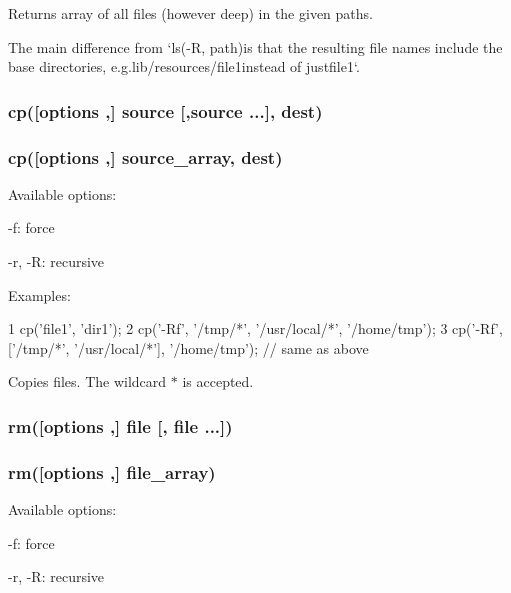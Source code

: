 Returns array of all files (however deep) in the given paths.

The main difference from `ls(\textquotesingle{}-\/\+R\textquotesingle{}, path){\ttfamily is that the resulting file names include the base directories, e.\+g.}lib/resources/file1{\ttfamily instead of just}file1`.

\subsubsection*{cp(\mbox{[}options ,\mbox{]} source \mbox{[},source ...\mbox{]}, dest)}

\subsubsection*{cp(\mbox{[}options ,\mbox{]} source\+\_\+array, dest)}

Available options\+:


\begin{DoxyItemize}
\item {\ttfamily -\/f}\+: force
\item {\ttfamily -\/r, -\/\+R}\+: recursive
\end{DoxyItemize}

Examples\+:


\begin{DoxyCode}
1 cp('file1', 'dir1');
2 cp('-Rf', '/tmp/*', '/usr/local/*', '/home/tmp');
3 cp('-Rf', ['/tmp/*', '/usr/local/*'], '/home/tmp'); // same as above
\end{DoxyCode}


Copies files. The wildcard {\ttfamily $\ast$} is accepted.

\subsubsection*{rm(\mbox{[}options ,\mbox{]} file \mbox{[}, file ...\mbox{]})}

\subsubsection*{rm(\mbox{[}options ,\mbox{]} file\+\_\+array)}

Available options\+:


\begin{DoxyItemize}
\item {\ttfamily -\/f}\+: force
\item {\ttfamily -\/r, -\/\+R}\+: recursive
\end{DoxyItemize}

